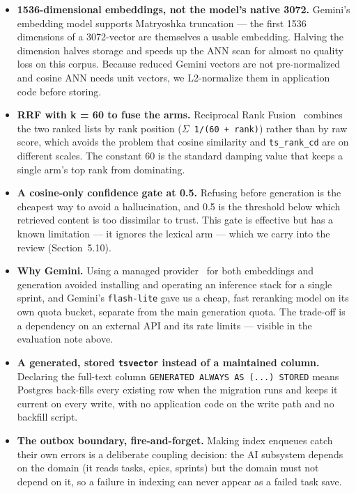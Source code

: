 \begin{itemize}
  \item \textbf{1536-dimensional embeddings, not the model's native 3072.} Gemini's embedding model supports Matryoshka
  truncation --- the first 1536 dimensions of a 3072-vector are themselves a usable embedding. Halving the
  dimension halves storage and speeds up the ANN scan for almost no quality loss on this corpus. Because reduced
  Gemini vectors are not pre-normalized and cosine ANN needs unit vectors, we L2-normalize them in application
  code before storing.
  \item \textbf{RRF with k = 60 to fuse the arms.} Reciprocal Rank Fusion~\cite{cormack2009rrf} combines the two ranked lists by rank position
  (\texttt{$\Sigma$ 1/(60 + rank)}) rather than by raw score, which avoids the problem that cosine similarity and
  \texttt{ts\_rank\_cd} are on different scales. The constant 60 is the standard damping value that keeps a single
  arm's top rank from dominating.
  \item \textbf{A cosine-only confidence gate at 0.5.} Refusing before generation is the cheapest way to avoid a
  hallucination, and 0.5 is the threshold below which retrieved content is too dissimilar to trust. This gate
  is effective but has a known limitation --- it ignores the lexical arm --- which we carry into the review (Section~5.10).
  \item \textbf{Why Gemini.} Using a managed provider~\cite{gemini} for both embeddings and generation avoided installing and
  operating an inference stack for a single sprint, and Gemini's \texttt{flash-lite} gave us a cheap, fast reranking
  model on its own quota bucket, separate from the main generation quota. The trade-off is a dependency on an
  external API and its rate limits --- visible in the evaluation note above.
  \item \textbf{A generated, stored \texttt{tsvector} instead of a maintained column.} Declaring the full-text column
  \texttt{GENERATED ALWAYS AS (...) STORED} means Postgres back-fills every existing row when the migration runs and
  keeps it current on every write, with no application code on the write path and no backfill script.
  \item \textbf{The outbox boundary, fire-and-forget.} Making index enqueues catch their own errors is a deliberate
  coupling decision: the AI subsystem depends on the domain (it reads tasks, epics, sprints) but the domain
  must not depend on it, so a failure in indexing can never appear as a failed task save.
\end{itemize}

